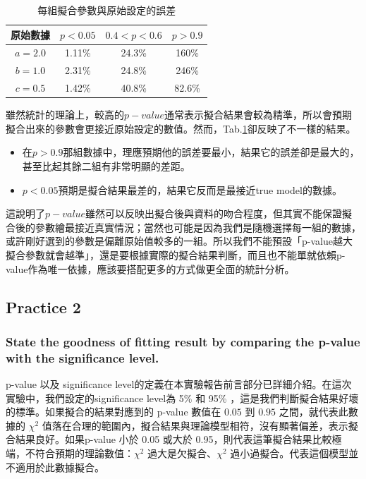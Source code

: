 \documentclass[12pt,a4paper]{article}
\begin{document}
\begin{CJK}{UTF8}{bkai}
\clearpage

\begin{table}[h]
    \centering
    \begin{tabular}{|c|c|c|c|}
        \hline
        原始數據&$p<0.05$&$0.4<p<0.6$&$p>0.9$\\
        \hline
        $a=2.0$&1.11\%&24.3\%&160\%\\
        \hline
        $b=1.0$&2.31\%&24.8\%&246\%\\
        \hline
        $c=0.5$&1.42\%&40.8\%&82.6\%\\
        \hline
    \end{tabular}
    \caption{每組擬合參數與原始設定的誤差}
    \label{tab:2}
\end{table}

雖然統計的理論上，較高的$p-value$通常表示擬合結果會較為精準，所以會預期擬合出來的參數會更接近原始設定的數值。然而，Tab.\ref{tab:2}卻反映了不一樣的結果。
\begin{itemize}
    \item 在$p>0.9$那組數據中，理應預期他的誤差要最小，結果它的誤差卻是最大的，甚至比起其餘二組有非常明顯的差距。
    \item $p<0.05$預期是擬合結果最差的，結果它反而是最接近true model的數據。
\end{itemize}

這說明了$p-value$雖然可以反映出擬合後與資料的吻合程度，但其實不能保證擬合後的參數繪最接近真實情況；當然也可能是因為我們是隨機選擇每一組的數據，或許剛好選到的參數是偏離原始值較多的一組。所以我們不能預設「p-value越大擬合參數就會越準」，還是要根據實際的擬合結果判斷，而且也不能單就依賴p-value作為唯一依據，應該要搭配更多的方式做更全面的統計分析。

\subsection{Practice 2}

\subsubsection{State the goodness of fitting result by comparing the \textbf{p-value} with the significance level.}
\hfill

p-value 以及 significance level的定義在本實驗報告前言部分已詳細介紹。在這次實驗中，我們設定的significance level為 5\% 和 95\% ，這是我們判斷擬合結果好壞的標準。如果擬合的結果對應到的 p-value 數值在 $0.05$ 到 $0.95$ 之間，就代表此數據的 $\chi^2$ 值落在合理的範圍內，擬合結果與理論模型相符，沒有顯著偏差，表示擬合結果良好。如果p-value 小於 0.05 或大於 0.95，則代表這筆擬合結果比較極端，不符合預期的理論數值：$\chi^2$ 過大是欠擬合、$\chi^2$ 過小過擬合。代表這個模型並不適用於此數據擬合。


\end{CJK}
\end{document}
